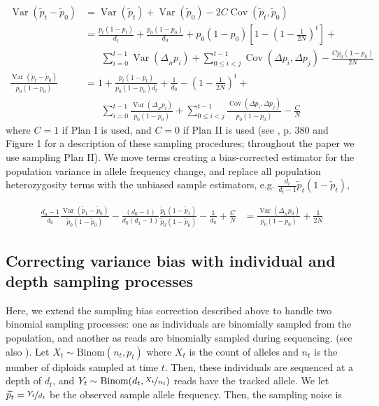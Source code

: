 \documentclass[11pt]{article}
\DeclareMathOperator{\var}{Var}
\DeclareMathOperator{\cov}{Cov}
\begin{document}
\begin{align}
  \var(\widetilde{p}_t - \widetilde{p}_0) &= \var(\widetilde{p}_t) + \var(\widetilde{p}_0) - 2 C \cov(\widetilde{p}_t, \widetilde{p}_0) \\
                                          &= \frac{p_t(1-p_t)}{d_t}  + \frac{p_0(1-p_0)}{d_0} + p_0(1-p_0) \left[1 - \left(1-\frac{1}{2N}\right)^t \right] + \\ & \;\;\;\;\;\;
                                               \sum_{i=0}^{t-1} \var(\Delta_{_H} p_i)  + \sum_{0 \le i < j}^{t-1} \cov(\Delta p_i, \Delta p_j) - \frac{C p_0(1-p_0)}{2N} \\
  \frac{\var(\widetilde{p}_t - \widetilde{p}_0)}{p_0(1-p_0)} &= 1 + \frac{p_t(1-p_t)}{p_0(1-p_0)d_t}  + \frac{1}{d_0} - \left(1-\frac{1}{2N}\right)^t + \\ & \;\;\;\;\;\;
  \sum_{i=0}^{t-1} \frac{\var(\Delta_{_H} p_i)}{p_0(1-p_0)}  + \sum_{0 \le i < j}^{t-1} \frac{\cov(\Delta p_i, \Delta p_j)}{p_0(1-p_0)} - \frac{C}{N}
\end{align}
%
where $C = 1$ if Plan I is used, and $C=0$ if Plan II is used (see
\cite{Waples1989-sj}, p. 380 and Figure 1 for a description of these sampling
procedures; throughout the paper we use sampling Plan II). We move terms
creating a bias-corrected estimator for the population variance in allele
frequency change, and replace all population heterozygosity terms with the
unbiased sample estimators, e.g. $\frac{d_t}{d_t-1} \widetilde{p}_t (1-
\widetilde{p}_t)$,

\begin{align}
  \label{supp:eqn-depth-only-correction}
  \frac{d_0-1}{d_0} \frac{\var(\widetilde{p}_1 - \widetilde{p}_0)}{\widetilde{p}_0(1-\widetilde{p}_0)} - \frac{(d_0-1)}{d_0 (d_1 - 1)} \frac{\widetilde{p}_1(1-\widetilde{p}_1)}{\widetilde{p}_0(1-\widetilde{p}_0)} - \frac{1}{d_0} + \frac{C}{N}  &= \frac{\var(\Delta_{_H} p_0)}{p_0(1-p_0)} + \frac{1}{2N} 
\end{align}

\subsection{Correcting variance bias with individual and depth sampling processes}
\label{supp:ind-depth-var-corr}

Here, we extend the sampling bias correction described above to handle two
binomial sampling processes: one as individuals are binomially sampled from the
population, and another as reads are binomially sampled during sequencing.
(see also \cite{Jonas2016-ia}). Let $X_t \sim \text{Binom}(n_t, p_t)$ where
$X_t$ is the count of alleles and $n_t$ is the number of diploids sampled at
time $t$. Then, these individuals are sequenced at a depth of $d_t$, and $Y_t
\sim \text{Binom}(d_t, \nicefrac{X_t}{n_t})$ reads have the tracked allele. We
let $\widetilde{p_t} = \nicefrac{Y_t}{d_t}$ be the observed sample allele
frequency. Then, the sampling noise is 
\end{document}
